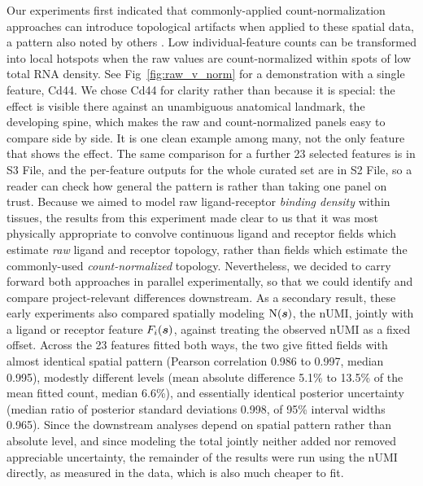 \documentclass[10pt,letterpaper]{article}
\begin{document}
Our experiments first indicated that commonly-applied count-normalization approaches can introduce topological artifacts when applied to these spatial data, a pattern also noted by others \cite{Bhuva2024}. Low individual-feature counts  can be transformed into local hotspots when the raw values are count-normalized within spots of low total RNA density. See Fig~\ref{fig:raw_v_norm} for a demonstration with a single feature, Cd44. We chose Cd44 for clarity rather than because it is special: the effect is visible there against an unambiguous anatomical landmark, the developing spine, which makes the raw and count-normalized panels easy to compare side by side. It is one clean example among many, not the only feature that shows the effect. The same comparison for a further 23 selected features is in S3 File, and the per-feature outputs for the whole curated set are in S2 File, so a reader can check how general the pattern is rather than taking one panel on trust. Because we aimed to model raw ligand-receptor \textit{binding density} within tissues, the results from this experiment made clear to us that it was most physically appropriate to convolve continuous ligand and receptor fields which estimate \textit{raw} ligand and receptor topology, rather than fields which estimate the commonly-used \textit{count-normalized} topology. Nevertheless, we decided to carry forward both approaches in parallel experimentally, so that we could identify and compare project-relevant differences downstream. As a secondary result, these early experiments also compared spatially modeling $\mbox{N}(\mbox{\boldmath $s$})$, the nUMI, jointly with a ligand or receptor feature $F_i(\mbox{\boldmath $s$})$, against treating the observed nUMI as a fixed offset. Across the 23 features fitted both ways, the two give fitted fields with almost identical spatial pattern (Pearson correlation 0.986 to 0.997, median 0.995), modestly different levels (mean absolute difference 5.1\% to 13.5\% of the mean fitted count, median 6.6\%), and essentially identical posterior uncertainty (median ratio of posterior standard deviations 0.998, of 95\% interval widths 0.965). Since the downstream analyses depend on spatial pattern rather than absolute level, and since modeling the total jointly neither added nor removed appreciable uncertainty, the remainder of the results were run using the nUMI directly, as measured in the data, which is also much cheaper to fit.
\end{document}
